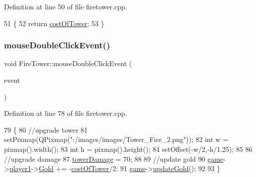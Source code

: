 Definition at line 50 of file firetower.\+cpp.


\begin{DoxyCode}
51 \{
52     \textcolor{keywordflow}{return} \hyperlink{class_fire_tower_ae05eab1ea0a68b5109ee91771d3c8569}{costOfTower};
53 \}
\end{DoxyCode}
\mbox{\label{class_fire_tower_a4deed164ccfbabcd7fc67e3973015f9f}} 
\subsubsection{\texorpdfstring{mouse\+Double\+Click\+Event()}{mouseDoubleClickEvent()}}
{\footnotesize\ttfamily void Fire\+Tower\+::mouse\+Double\+Click\+Event (\begin{DoxyParamCaption}\item[{Q\+Graphics\+Scene\+Mouse\+Event $\ast$}]{event }\end{DoxyParamCaption})}



Definition at line 78 of file firetower.\+cpp.


\begin{DoxyCode}
79 \{
80     \textcolor{comment}{//upgrade tower}
81     setPixmap(QPixmap(\textcolor{stringliteral}{":/images/images/Tower\_Fire\_2.png"}));
82     \textcolor{keywordtype}{int} w = pixmap().width();
83     \textcolor{keywordtype}{int} h = pixmap().height();
84     setOffset(-w/2,-h/1.25);
85 
86     \textcolor{comment}{//upgrade damage}
87     \hyperlink{class_fire_tower_a59a01cc273823ea5451179dbc1f4aded}{towerDamage} = 70;
88 
89     \textcolor{comment}{//update gold}
90     \hyperlink{firetower_8cpp_a58bdb5643d0814ac4e697a1564b79b70}{game}->\hyperlink{class_game_ad8a7cc146f99c7ec5b7c3c25d73f118c}{player1}->\hyperlink{class_player1_ab390478b345e443398bac442a04b675c}{Gold} += -\hyperlink{class_fire_tower_ae05eab1ea0a68b5109ee91771d3c8569}{costOfTower}/2;
91     \hyperlink{firetower_8cpp_a58bdb5643d0814ac4e697a1564b79b70}{game}->\hyperlink{class_game_a065998f7609f63e2987ede928359595a}{updateGold}();
92 
93 \}
\end{DoxyCode}
\mbox{\label{class_fire_tower_a1768ca309eccef5f7f093f37741ba572}} 
